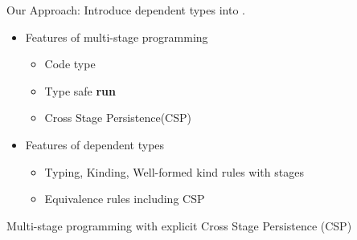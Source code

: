 \documentclass[dvipdfmx,aspectratio=169, 20pt]{beamer}
\begin{document}

\begin{frame}[fragile]{Our Approach: \LMD}
    Introduce dependent types into .
    \begin{itemize}
        \item Features of multi-stage programming
            \begin{itemize}
                \item Code type
                \item Type safe {\bf{run}}
                \item Cross Stage Persistence(CSP)
            \end{itemize}
        \item Features of dependent types
            \begin{itemize}
                \item Typing, Kinding, Well-formed kind rules with stages
                \item Equivalence rules including CSP
            \end{itemize}
    \end{itemize}
\end{frame}

\begin{frame}[fragile]{}
    Multi-stage programming with explicit Cross Stage Persistence (CSP)
\end{frame}
\end{document}
